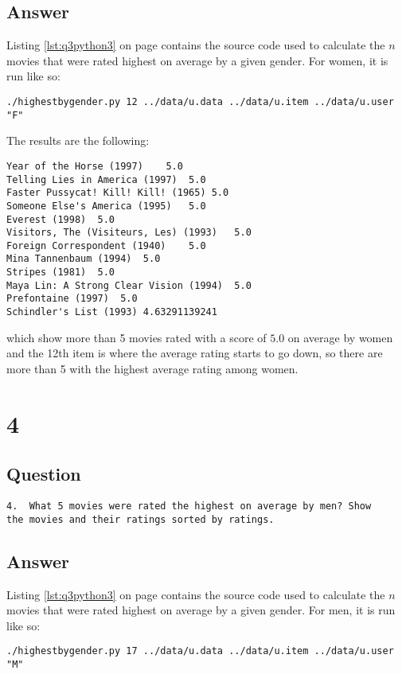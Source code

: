 \documentclass[letterpaper,11pt]{article}
\begin{document}
\subsection*{Answer}

Listing \ref{lst:q3python3} on page \pageref{lst:q3python3} contains the source code used to calculate the $n$ movies that were rated highest on average by a given gender.  For women, it is run like so:
\begin{lstlisting}[frame=single]
./highestbygender.py 12 ../data/u.data ../data/u.item ../data/u.user  "F"
\end{lstlisting}

The results are the following:
\begin{lstlisting}[frame=single]
Year of the Horse (1997)	5.0
Telling Lies in America (1997)	5.0
Faster Pussycat! Kill! Kill! (1965)	5.0
Someone Else's America (1995)	5.0
Everest (1998)	5.0
Visitors, The (Visiteurs, Les) (1993)	5.0
Foreign Correspondent (1940)	5.0
Mina Tannenbaum (1994)	5.0
Stripes (1981)	5.0
Maya Lin: A Strong Clear Vision (1994)	5.0
Prefontaine (1997)	5.0
Schindler's List (1993)	4.63291139241
\end{lstlisting}
which show more than 5 movies rated with a score of $5.0$  on average by women and the 12th item is where the average rating starts to go down, so there are more than 5 with the highest average rating among women.

\newpage

\section*{4}

\subsection*{Question}

\begin{verbatim}
4.  What 5 movies were rated the highest on average by men? Show
the movies and their ratings sorted by ratings.
\end{verbatim}

\subsection*{Answer}

Listing \ref{lst:q3python3} on page \pageref{lst:q3python3} contains the source code used to calculate the $n$ movies that were rated highest on average by a given gender.  For men, it is run like so:
\begin{lstlisting}[frame=single]
./highestbygender.py 17 ../data/u.data ../data/u.item ../data/u.user  "M"
\end{lstlisting}
\end{document}
